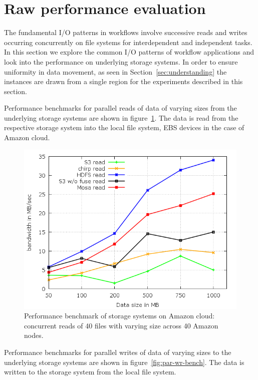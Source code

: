 \documentclass[10pt,journal,cspaper,compsoc]{IEEEtran}
\begin{document}
\section{Raw performance evaluation}\label{sec:perf}
The fundamental I/O patterns in workflows involve successive reads and writes
occurring concurrently on file systems for interdependent and independent
tasks. In this section we explore the common I/O patterns of workflow
applications and look into the performance on underlying storage systems. In order to
ensure uniformity in data movement, as seen in Section~\ref{sec:understanding}
the instances are drawn from a single region for the experiments described in
this section.

Performance benchmarks for parallel reads of data of varying sizes from the
underlying storage systems are shown in figure~\ref{fig:par-rd-bench}. The data
is read from the respective storage system into the local file system, EBS
devices in the case of Amazon cloud.

\begin{figure}[htb]
\begin{center}
\includegraphics[width=\linewidth]{plots/par-read-bw.png}
\caption{Performance benchmark of storage systems on Amazon cloud:
concurrent reads of 40 files with varying size across 40 Amazon nodes.
\label{fig:par-rd-bench} }
\end{center}
\end{figure}

Performance benchmarks for parallel writes of data of varying sizes to the
underlying storage systems are shown in figure~\ref{fig:par-wr-bench}. The data
is written to the storage system from the local file system.
\end{document}
